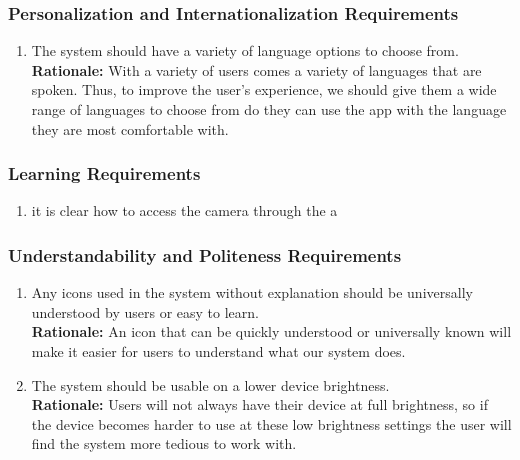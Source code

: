 \documentclass[]{article}
\begin{document}
\subsubsection{Personalization and Internationalization Requirements}
\label{ssub:personalization_and_internationalization_requirements}
\begin{enumerate}[label={UH-PI\arabic*.}]
	\item The system should have a variety of language options to choose from.\\
	\textbf{Rationale:} With a variety of users comes a variety of languages that are spoken. Thus, to improve the user's experience, we should give them a wide range of languages to choose from do they can use the app with the language they are most comfortable with.
\end{enumerate}

\subsubsection{Learning Requirements}
\label{ssub:learning_requirements}
\begin{enumerate}[label={UH-L\arabic*.}]
	\item it is clear how to access the camera through the a	
\end{enumerate}

\subsubsection{Understandability and Politeness Requirements}
\label{ssub:understandability_and_politeness_requirements}
\begin{enumerate}[label={UH-UP\arabic*.}]
	\item Any icons used in the system without explanation should be universally understood by users or easy to learn.\\
	\textbf{Rationale:} An icon that can be quickly understood or universally known will make it easier for users to understand what our system does.
	\item The system should be usable on a lower device brightness.\\
	\textbf{Rationale:} Users will not always have their device at full brightness, so if the device becomes harder to use at these low brightness settings the user will find the system more tedious to work with.
\end{enumerate}
\end{document}
